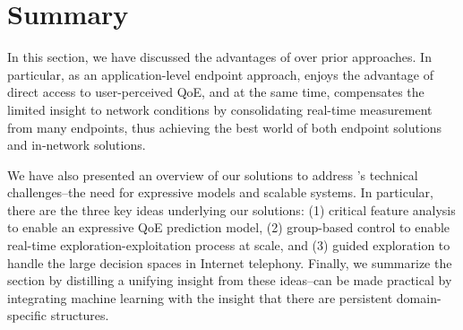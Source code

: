  


\section{Summary}

In this section, we have discussed the advantages
of \ddn over prior approaches. 
In particular, as an application-level endpoint 
approach, \ddn enjoys the advantage of direct 
access to user-perceived QoE, and at the same
time, compensates the limited insight to network 
conditions by consolidating real-time measurement
from many endpoints, thus achieving the best world
of both endpoint solutions and in-network solutions.

We have also presented an overview of our solutions
to address \ddn's technical challenges--the need for 
expressive models and scalable systems. 
In particular, there are the three key ideas underlying 
our solutions: 
(1) critical feature analysis to enable an expressive 
QoE prediction model, 
(2) group-based control to enable real-time 
exploration-exploitation process at scale, and
(3) guided exploration to handle the large 
decision spaces in Internet telephony.
Finally, we summarize the section by distilling 
a unifying insight from these 
ideas--\ddn can be made practical by integrating
machine learning with the insight that there are 
persistent domain-specific structures.







